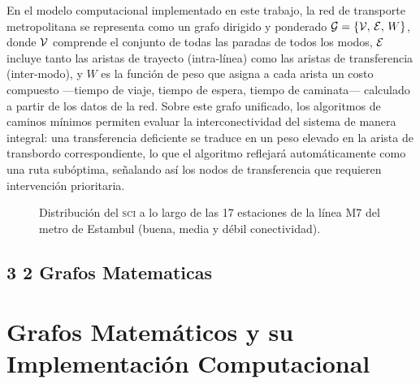 En el modelo computacional implementado en este trabajo, la red de transporte
metropolitana se representa como un grafo dirigido y ponderado
$\mathcal{G} = \{\mathcal{V},\, \mathcal{E},\, W\}$, donde $\mathcal{V}$ comprende el conjunto de todas
las paradas de todos los modos, $\mathcal{E}$ incluye tanto las aristas de trayecto
(intra-línea) como las aristas de transferencia (inter-modo), y $W$ es la función de
peso que asigna a cada arista un costo compuesto ---tiempo de viaje, tiempo de
espera, tiempo de caminata--- calculado a partir de los datos \gtfs{} de la red. Sobre
este grafo unificado, los algoritmos de caminos mínimos permiten evaluar la
interconectividad del sistema de manera integral: una transferencia deficiente se
traduce en un peso elevado en la arista de transbordo correspondiente, lo que el
algoritmo reflejará automáticamente como una ruta subóptima, señalando así los
nodos de transferencia que requieren intervención prioritaria.

\begin{figure}[H]
  \centering
  \caption[Índice de Conectividad Simplificado en la línea M7 de Estambul]{
  Distribución del \textsc{sci} a lo largo de las 17 estaciones de la línea M7
  del metro de Estambul (buena, media y débil conectividad).}
  \label{fig:sci-estambul}
 \end{figure}

\subsection*{3 2 Grafos Matematicas}
\section{Grafos Matemáticos y su Implementación Computacional}
\label{sec:grafos-matematicos}

